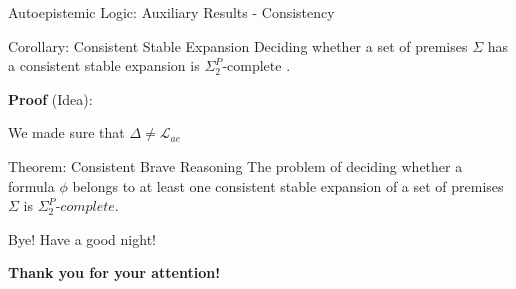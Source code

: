 \documentclass[usenames,dvipsnames, 8pt]{beamer}
\begin{document}
\begin{frame}{Autoepistemic Logic: Auxiliary Results - Consistency}

\begin{block}{Corollary: Consistent Stable Expansion}
Deciding whether a set of premises $\Sigma$ has a consistent stable expansion is $\Sigma_2^P\text{-complete}$ .
\end{block}

\textbf{Proof} (Idea):

We made sure that $\Delta \neq \mathcal{L}_{ae}$


\begin{block}{Theorem: Consistent Brave Reasoning}
The problem of deciding whether a formula $\phi$ belongs to at least one consistent stable expansion of a set of premises $\Sigma$ is $\Sigma_2^P\textit{-complete}$.
\end{block}

\end{frame}



\begin{frame}{Bye! Have a good night!}


\begin{block}{}
\begin{center}
\huge
\textbf{Thank you for your attention!}
\end{center} 
\end{block}
\end{frame}
\end{document}
